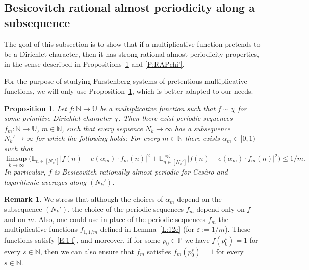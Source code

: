 \documentclass[11pt]{amsart}
\newtheorem{proposition}[lemma]{Proposition}
\theoremstyle{definition}
\newtheorem*{remark}{Remark}
\newcommand{\lE}{\mathbb{E}^{\log}}
\newcommand{\E}{{\mathbb E}}
\newcommand{\N}{{\mathbb N}}
\renewcommand{\P}{{\mathbb P}}
\newcommand{\U}{{\mathbb U}}
\begin{document}
	
	
	\subsection{Besicovitch rational almost periodicity along a subsequence} The goal of this subsection is to show that if a  multiplicative function   pretends to be a Dirichlet character, then it
	has strong rational almost periodicity properties, in the sense described in Propositions~\ref{P:RAPchi} and \ref{P:RAPchi'}.
	
For the purpose of studying Furstenberg systems of pretentious multiplicative functions,
we will only use Proposition~\ref{P:RAPchi}, which is better adapted to our needs.
 \begin{proposition}\label{P:RAPchi}
	Let $f\colon \N\to \U$ be a  multiplicative function such that $f\sim  \chi$ for some primitive Dirichlet character $\chi$.  Then there exist periodic sequences $f_m\colon \N\to \U$, $m\in\N$,  such that every  sequence  $N_k\to \infty$ has a subsequence $N_k'\to \infty$ for which the following holds:  For every $m\in\N$  there exists $\alpha_m\in[0,1)$ such that
	\begin{equation}\label{E:logCes}
		\limsup_{k\to\infty} \big(\E_{n\in [N_k']}|f(n)-e(\alpha_m)\cdot  f_m(n)|^2  +\lE_{n\in [N_k']}|f(n)-e(\alpha_m)\cdot  f_m(n)|^2\big)\leq 1/m.
	\end{equation}
In particular, $f$ is Besicovitch rationally almost periodic for Ces\`aro and logarithmic averages along $(N_k')$.
\end{proposition}
\begin{remark}
	We stress  that although the choices of $\alpha_m$ depend on the subsequence $(N_k')$, the choice of the periodic sequences $f_m$ depend only on $f$ and on $m$. Also, one could use in place of the periodic sequences  $f_m$ the multiplicative functions $f_{1,1/m}$ defined  in Lemma~\ref{L:12e} (for $\varepsilon:=1/m$). These functions  satisfy \eqref{E:1-f}, and moreover, 
	  	if for some $p_0\in \P$ we have $f(p_0^s)=1$ for every $s\in \N$, then  we can also ensure that $f_m$   satisfies $f_m(p_0^s)=1$ for every $s\in \N$.
\end{remark}
\end{document}
